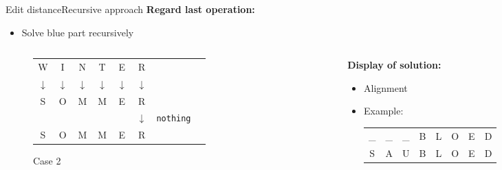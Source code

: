 \begin{frame}{Edit distance}{Recursive approach}
  \textbf{Regard last operation:}
  \begin{itemize}
    \item
      Solve {\color{Mittel-Blau}blue} part recursively
  \end{itemize}
  \begin{columns}
    \begin{column}{0.3\linewidth}
      \begin{figure}[!h]
        \begin{center}
          \begin{tabular}{c@{}c@{}c@{}c@{}c@{}c@{}c@{}l}
            \color{Mittel-Blau}W & \color{Mittel-Blau}I & \color{Mittel-Blau}N &
            \color{Mittel-Blau}T & \color{Mittel-Blau}E & \color{Mittel-Blau}R\\
            \color{Mittel-Blau}$\downarrow$ & \color{Mittel-Blau}$\downarrow$ &
            \color{Mittel-Blau}$\downarrow$ & \color{Mittel-Blau}$\downarrow$ &
            \color{Mittel-Blau}$\downarrow$ & \color{Mittel-Blau}$\downarrow$\\
            \color{Mittel-Blau}S & \color{Mittel-Blau}O & \color{Mittel-Blau}M &
            \color{Mittel-Blau}M & \color{Mittel-Blau}E & \color{Mittel-Blau}R\\
            {} & {} & {} & {} & {} & $\downarrow$ & \texttt{nothing}\\
            S & O & M & M & E & R
          \end{tabular}
        \end{center}
        \caption{Case 2}
      \end{figure}
    \end{column}
    \begin{column}{0.5\linewidth}
      \textbf{Display of solution:}
      \begin{itemize}
        \item
          Alignment
        \item
          Example:
          \begin{tabular}{cccccccc}
            \_ & \_ & \_ & B & L & O & E & D\\
            S & A & U & B & L & O & E & D
          \end{tabular}
      \end{itemize}
    \end{column}
  \end{columns}
\end{frame}

